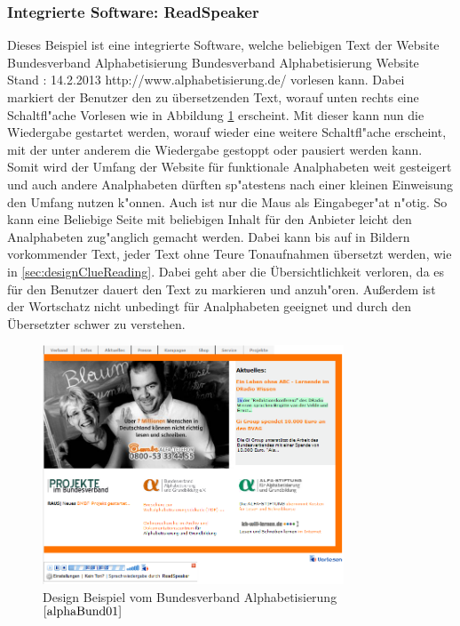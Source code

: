 \subsubsection{ Integrierte Software: ReadSpeaker}

Dieses Beispiel ist eine integrierte Software, welche beliebigen Text der Website Bundesverband Alphabetisierung
						{Bundesverband Alphabetisierung Website}
						{Stand : 14.2.2013}
						{http://www.alphabetisierung.de/}
vorlesen kann.
Dabei markiert der Benutzer den zu übersetzenden Text, worauf unten rechts eine Schaltfl"ache \glqq Vorlesen \grqq wie in Abbildung  \ref{fig:DesignBeispiel1} erscheint. Mit dieser kann nun die Wiedergabe gestartet werden, worauf wieder eine weitere Schaltfl"ache erscheint, mit der unter anderem die Wiedergabe gestoppt oder pausiert werden kann.\\
Somit wird der Umfang der Website für funktionale Analphabeten weit gesteigert und auch andere Analphabeten dürften sp"atestens nach einer kleinen Einweisung den Umfang nutzen k"onnen. Auch ist nur die Maus als Eingabeger"at n"otig. So kann eine Beliebige Seite mit beliebigen Inhalt für den Anbieter leicht den Analphabeten zug"anglich gemacht werden. Dabei kann bis auf in Bildern vorkommender Text, jeder Text ohne Teure Tonaufnahmen übersetzt werden, wie in \ref{sec:designClueReading}. Dabei geht aber die Übersichtlichkeit verloren, da es für den Benutzer dauert den Text zu markieren und anzuh"oren. Außerdem ist der Wortschatz nicht unbedingt für Analphabeten geeignet und durch den Übersetzter schwer zu verstehen.
\begin{figure}[h]
	\centering
		\includegraphics[width=0.80\textwidth]{Daten/DesignBeispiel1.png}
	\caption{Design Beispiel vom Bundesverband Alphabetisierung $^{\ref{alphaBund01}}$}
	\label{fig:DesignBeispiel1}
\end{figure}


